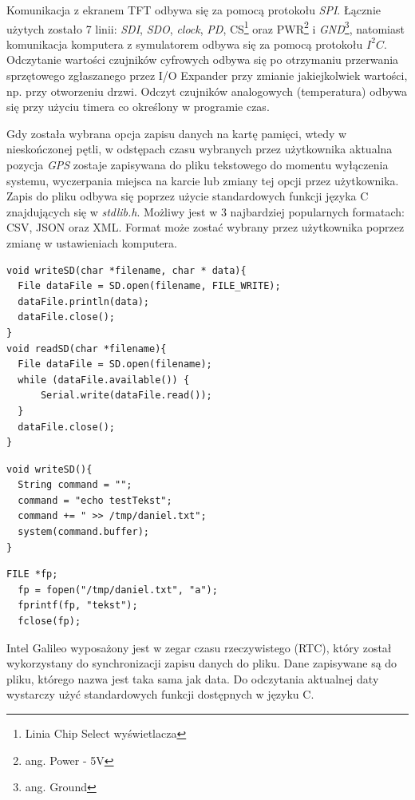 \documentclass{xmgr}
\begin{document}
Komunikacja z ekranem TFT odbywa się za pomocą protokołu \emph{SPI}. Łącznie użytych zostało 7 linii: \emph{SDI}, \emph{SDO}, \emph{clock}, \emph{PD}, CS\footnote{Linia Chip Select wyświetlacza} oraz PWR\footnote{ang. Power - 5V} i \emph{GND}\footnote{ang. Ground}, natomiast komunikacja komputera z symulatorem odbywa się za pomocą protokołu $I^2C$. Odczytanie wartości czujników cyfrowych odbywa się po otrzymaniu przerwania sprzętowego zgłaszanego przez I/O Expander przy zmianie jakiejkolwiek wartości, np. przy otworzeniu drzwi. Odczyt czujników analogowych (temperatura) odbywa się przy użyciu timera co określony w programie czas.

Gdy została wybrana opcja zapisu danych na kartę pamięci, wtedy w nieskończonej pętli, w odstępach czasu wybranych przez użytkownika aktualna pozycja \emph{GPS} zostaje zapisywana do pliku tekstowego do momentu wyłączenia systemu, wyczerpania miejsca na karcie lub zmiany tej opcji przez użytkownika. Zapis do pliku odbywa się poprzez użycie standardowych funkcji języka C znajdujących się w \emph{stdlib.h}. Możliwy jest w 3 najbardziej popularnych formatach: CSV, JSON oraz XML. Format może zostać wybrany przez użytkownika poprzez zmianę w ustawieniach komputera.

\begin{lstlisting}[label=bot-dirs-alg,caption=Obsługa karty microSD za pomocą mechanizmu Arduino]
void writeSD(char *filename, char * data){
  File dataFile = SD.open(filename, FILE_WRITE);
  dataFile.println(data);
  dataFile.close();
}
void readSD(char *filename){
  File dataFile = SD.open(filename);
  while (dataFile.available()) {
      Serial.write(dataFile.read());
  }
  dataFile.close();
}
\end{lstlisting}

\begin{lstlisting}[label=bot-dirs-alg,caption=Obsługa karty microSD za pomocą mechanizmu systemu operacyjnego]
void writeSD(){
  String command = "";  
  command = "echo testTekst";
  command += " >> /tmp/daniel.txt";
  system(command.buffer);
}
\end{lstlisting}

\begin{lstlisting}[label=bot-dirs-alg,caption=Obsługa karty microSD za pomocą języka C]
  FILE *fp;
  fp = fopen("/tmp/daniel.txt", "a");
  fprintf(fp, "tekst");
  fclose(fp);
\end{lstlisting}

Intel Galileo wyposażony jest w zegar czasu rzeczywistego (RTC), który został wykorzystany do synchronizacji zapisu danych do pliku. Dane zapisywane są do pliku, którego nazwa jest taka sama jak data. Do odczytania aktualnej daty wystarczy użyć standardowych funkcji dostępnych w języku C. 
\end{document}
